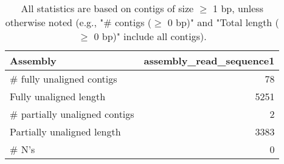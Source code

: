 \documentclass[12pt,a4paper]{article}
\begin{document}
\begin{table}[ht]
\begin{center}
\caption{All statistics are based on contigs of size $\geq$ 1 bp, unless otherwise noted (e.g., "\# contigs ($\geq$ 0 bp)" and "Total length ($\geq$ 0 bp)" include all contigs).}
\begin{tabular}{|l*{1}{|r}|}
\hline
Assembly & assembly\_read\_sequence1 \\ \hline
\# fully unaligned contigs & 78 \\ \hline
Fully unaligned length & 5251 \\ \hline
\# partially unaligned contigs & 2 \\ \hline
Partially unaligned length & 3383 \\ \hline
\# N's & 0 \\ \hline
\end{tabular}
\end{center}
\end{table}
\end{document}
